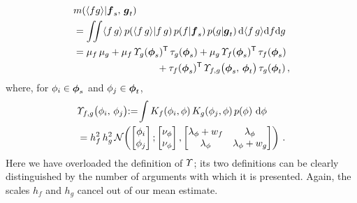 \documentclass{article}
\begin{document}
\begin{align*} %
& \mean{\inty{f g}}{\vf_{s},\,\vg_{t}} \nonumber\\
& 
=
\iint \inty{f\,g}\,\p{\inty{f\,g}}{{f\,g}}
\p{f}{\vf_s}\p{g}{\vg_t}\ud \inty{f\,g}\ud f\ud g                                                                                                                                                                      \nonumber\\
&
 = 
\mu_f\,\mu_g
+ \mu_f\,\ntT{s}{g}\, \dtt{s}{g}
+ \mu_g\,\ntT{s}{f}\, \dtt{s}{f}
\nonumber\\
&\hspace{3cm}
+ \dtt{{s}}{f}\tra\,\Ot_{f,g}\bigr(\vph_{s},\,\vph_{t}\bigr)\,\dtt{{t}}{g}
\,,
\end{align*}
where, for $\phi_i \in \vph_{s}$ and $\phi_j \in \vph_{t}$,
\begin{align*} %
& \Ot_{f,g}\bigr(\phi_{i},\,\phi_{j}\bigl) 
\deq 
\!\int K_{f}(\phi_i,\phi)\,K_{g}(\phi_j,\phi)\,\po{\phi}\, \ud\phi\nonumber\\
& =h_{f}^2\, h_{g}^2\,
\N{\begin{bmatrix} \phi_i \\ \phi_j \end{bmatrix}}
{\begin{bmatrix} \nu_{\phi}\\ \nu_{\phi}\end{bmatrix}}
{\begin{bmatrix}  
\lambda_\phi+w_{f} & \lambda_\phi \\ 
\lambda_\phi & \lambda_\phi +w_{g}
\end{bmatrix}}\,.
\end{align*}
Here we have overloaded the definition of $\Ot$; its two definitions can be clearly distinguished by the number of arguments with which it is presented. 
Again, the scales $h_f$ and $h_g$ cancel out of our mean estimate.
\end{document}
